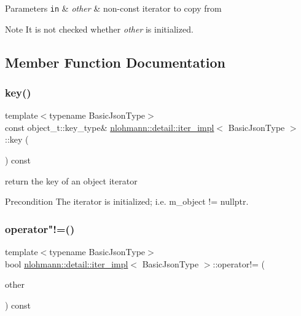 \begin{DoxyParams}[1]{Parameters}
\mbox{\tt in}  & {\em other} & non-\/const iterator to copy from \\
\hline
\end{DoxyParams}
\begin{DoxyNote}{Note}
It is not checked whether {\itshape other} is initialized. 
\end{DoxyNote}


\subsection{Member Function Documentation}
\mbox{\label{classnlohmann_1_1detail_1_1iter__impl_a15dfb2744fed2ef40c12a9e9a20d6dbc}} 
\subsubsection{\texorpdfstring{key()}{key()}}
{\footnotesize\ttfamily template$<$typename Basic\+Json\+Type$>$ \\
const object\+\_\+t\+::key\+\_\+type\& \hyperlink{classnlohmann_1_1detail_1_1iter__impl}{nlohmann\+::detail\+::iter\+\_\+impl}$<$ Basic\+Json\+Type $>$\+::key (\begin{DoxyParamCaption}{ }\end{DoxyParamCaption}) const\hspace{0.3cm}{\ttfamily [inline]}}



return the key of an object iterator 

\begin{DoxyPrecond}{Precondition}
The iterator is initialized; i.\+e. {\ttfamily m\+\_\+object != nullptr}. 
\end{DoxyPrecond}
\mbox{\label{classnlohmann_1_1detail_1_1iter__impl_aeab0e2b5da70b3bdebecd5b1a6ee66a6}} 
\subsubsection{\texorpdfstring{operator"!=()}{operator!=()}}
{\footnotesize\ttfamily template$<$typename Basic\+Json\+Type$>$ \\
bool \hyperlink{classnlohmann_1_1detail_1_1iter__impl}{nlohmann\+::detail\+::iter\+\_\+impl}$<$ Basic\+Json\+Type $>$\+::operator!= (\begin{DoxyParamCaption}\item[{const \hyperlink{classnlohmann_1_1detail_1_1iter__impl}{iter\+\_\+impl}$<$ Basic\+Json\+Type $>$ \&}]{other }\end{DoxyParamCaption}) const\hspace{0.3cm}{\ttfamily [inline]}}



